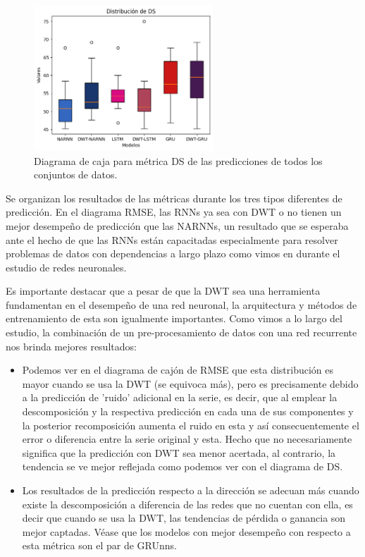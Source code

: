 \begin{figure}[H]
    \centering
    \includegraphics[width=0.6\textwidth]{Figuras/analisis/DS.png}
    \caption{Diagrama de caja para métrica DS de las predicciones de todos los conjuntos de datos.} 
    \label{fig:DS}
\end{figure}

Se organizan los resultados de las métricas durante los tres tipos diferentes de predicción. En el diagrama RMSE, las RNNs ya sea con DWT o no tienen un mejor desempeño de predicción que las NARNNs, un resultado que se esperaba ante el hecho de que las RNNs están capacitadas especialmente para resolver problemas de datos con dependencias a largo plazo como vimos en durante el estudio de redes neuronales.

Es importante destacar que a pesar de que la DWT sea una herramienta fundamentan en el desempeño de una red neuronal, la arquitectura y métodos de entrenamiento de esta son igualmente importantes. Como vimos a lo largo del estudio, la combinación de un pre-procesamiento de datos con una red recurrente nos brinda mejores resultados:

\begin{itemize}
    \item Podemos ver en el diagrama de cajón de RMSE que esta distribución es mayor cuando se usa la DWT (se equivoca más), pero es precisamente debido a la predicción de 'ruido' adicional en la serie, es decir, que al emplear la descomposición y la respectiva predicción en cada una de sus componentes y la posterior recomposición aumenta el ruido en esta y así consecuentemente el error o diferencia entre la serie original y esta. Hecho que no necesariamente significa que la predicción con DWT sea menor acertada, al contrario, la tendencia se ve mejor reflejada como podemos ver con el diagrama de DS.
    \item Los resultados de la predicción respecto a la dirección se adecuan más cuando existe la descomposición a diferencia de las redes que no cuentan con ella, es decir que cuando se usa la DWT, las tendencias de pérdida o ganancia son mejor captadas. Véase que los modelos con mejor desempeño con respecto a esta métrica son el par de GRUnns.
   
\end{itemize}